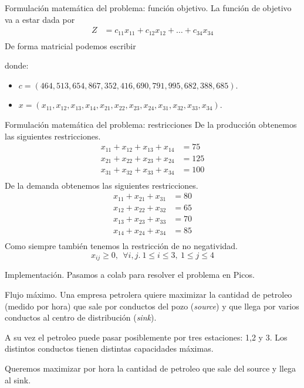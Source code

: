 \documentclass{beamer}
\begin{document}
  \begin{frame}[fragile]{Formulación matemática del problema: función objetivo.}
    La función de objetivo va a estar dada por 
    \begin{align*}
      Z &= c_{11}x_{11} + c_{12}x_{12} + \dots +  c_{34}x_{34} \\
    \end{align*}
    \pause 
    De forma matricial podemos escribir 

    donde:
    \begin{itemize}
      \item $c = ( 464 , 513 , 654 , 867 , 352 , 416 , 690 , 791 , 995 , 682 , 388 , 685 )$.
      \item $x = (x_{11}, x_{12}, x_{13},x_{14},x_{21}, x_{22}, x_{23},x_{24} ,x_{31}, x_{32}, x_{33}, x_{34})$.
    \end{itemize}
  \end{frame}

  \begin{frame}[fragile]{Formulación matemática del problema: restricciones}
    De la producción obtenemos las siguientes restricciones.
    \begin{align*}
      x_{11} + x_{12} + x_{13} + x_{14} &= 75 \\
      x_{21} + x_{22} + x_{23} + x_{24} &= 125 \\
      x_{31} + x_{32} + x_{33} + x_{34} &= 100 \\
    \end{align*}
    \pause 
    De la demanda obtenemos las siguientes restricciones.
    \begin{align*}
      x_{11} + x_{21} + x_{31} &= 80 \\
      x_{12} + x_{22} + x_{32} &= 65 \\
      x_{13} + x_{23} + x_{33} &= 70 \\
      x_{14} + x_{24} + x_{34} &= 85 \\
    \end{align*}
    \pause 
    Como siempre también tenemos la restricción de no negatividad.
    \[
      x_{ij} \ge 0, \ \ \forall i,j. \ 1 \le i \le 3, \ 1 \le j \le 4
    \]
  \end{frame}
  \begin{frame}[fragile]{Implementación.}
    Pasamos a colab para resolver el problema en Picos.
  \end{frame}

  \begin{frame}[fragile]{Flujo máximo.}
    Una empresa petrolera quiere maximizar la cantidad de petroleo (medido por hora) que sale por conductos del pozo (\emph{source}) y que llega por varios conductos al centro de distribución (\emph{sink}).
    \pause 

    A su vez el petroleo puede pasar posiblemente por tres estaciones: 1,2 y 3.
    Los distintos conductos tienen distintas capacidades máximas.

    \pause 

    Queremos maximizar por hora la cantidad de petroleo que sale del source y llega al sink.
  \end{frame}
\end{document}
